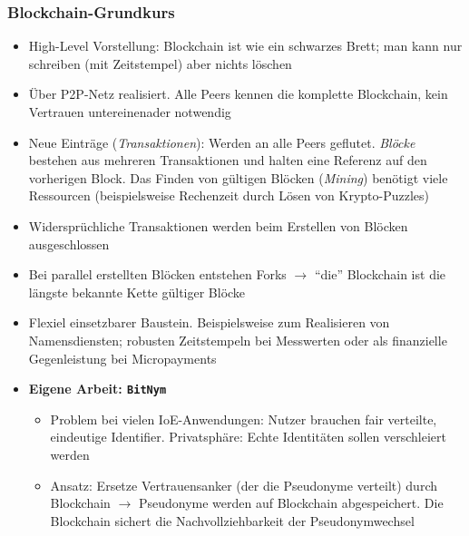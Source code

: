 \subsubsection{Blockchain-Grundkurs}
\begin{itemize}
	\item High-Level Vorstellung: Blockchain ist wie ein schwarzes Brett; man kann nur schreiben (mit Zeitstempel) aber nichts löschen
	\item Über P2P-Netz realisiert. Alle Peers kennen die komplette Blockchain, kein Vertrauen untereinenader notwendig
	\item Neue Einträge (\textit{Transaktionen}): Werden an alle Peers geflutet. \textit{Blöcke} bestehen aus mehreren Transaktionen und halten eine Referenz auf den vorherigen Block. Das Finden von gültigen Blöcken (\textit{Mining}) benötigt viele Ressourcen (beispielsweise Rechenzeit durch Lösen von Krypto-Puzzles)
	\item Widersprüchliche Transaktionen werden beim Erstellen von Blöcken ausgeschlossen
	\item Bei parallel erstellten Blöcken entstehen Forks \(\rightarrow\) "`die"' Blockchain ist die längste bekannte Kette gültiger Blöcke
	\item Flexiel einsetzbarer Baustein. Beispielsweise zum Realisieren von Namensdiensten; robusten Zeitstempeln bei Messwerten oder als finanzielle Gegenleistung bei Micropayments
	\item \textbf{Eigene Arbeit: \texttt{BitNym}}
	\begin{itemize}
		\item Problem bei vielen IoE-Anwendungen: Nutzer brauchen fair verteilte, eindeutige Identifier. Privatsphäre: Echte Identitäten sollen verschleiert werden
		\item Ansatz: Ersetze Vertrauensanker (der die Pseudonyme verteilt) durch Blockchain \(\rightarrow\) Pseudonyme werden auf Blockchain abgespeichert. Die Blockchain sichert die Nachvollziehbarkeit der Pseudonymwechsel
	\end{itemize}
\end{itemize}


